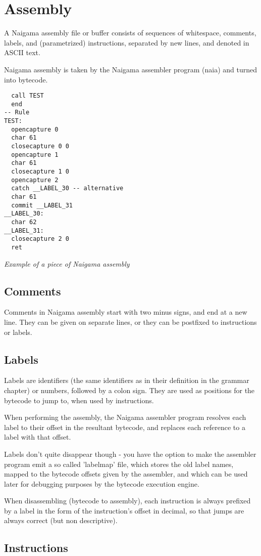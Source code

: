 \section{Assembly}

A Naigama assembly file or buffer consists of sequences of
whitespace, comments, labels, and (parametrized) instructions, separated
by new lines, and denoted in ASCII text.

Naigama assembly is taken by the Naigama assembler program (naia) and turned
into bytecode.

\begin{myquote}
\begin{verbatim}
  call TEST
  end
-- Rule
TEST:
  opencapture 0
  char 61
  closecapture 0 0
  opencapture 1
  char 61
  closecapture 1 0
  opencapture 2
  catch __LABEL_30 -- alternative
  char 61
  commit __LABEL_31
__LABEL_30:
  char 62
__LABEL_31:
  closecapture 2 0
  ret

\end{verbatim}
\end{myquote}
\textit{Example of a piece of Naigama assembly}

\subsection{Comments}

Comments in Naigama assembly start with two minus signs, and end at
a new line. They can be given on separate lines, or they can be
postfixed to instructions or labels.

\subsection{Labels}

Labels are identifiers (the same identifiers as in their definition
in the grammar chapter) or numbers, followed by a colon sign. They are used
as positions for the bytecode to jump to, when used by instructions.

When performing the assembly, the Naigama assembler program resolves
each label to their offset in the resultant bytecode, and replaces each
reference to a label with that offset.

Labels don't quite disappear though - you have the option to make the
assembler program emit a so called 'labelmap' file, which stores the old
label names, mapped to the bytecode offsets given by the assembler,
and which can be used later
for debugging purposes by the bytecode execution engine.

When disassembling (bytecode to assembly), each instruction is always
prefixed by a label in the form of the instruction's offset in decimal,
so that jumps are always correct (but non descriptive).

\subsection{Instructions}



